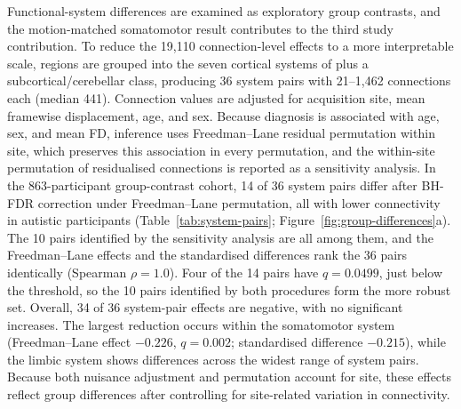 Functional-system differences are examined as exploratory group contrasts, and the motion-matched somatomotor result contributes to the third study contribution. To reduce the 19,110 connection-level effects to a more interpretable scale, regions are grouped into the seven cortical systems of \citet{Yeoetal2011} plus a subcortical/cerebellar class, producing 36 system pairs with 21--1,462 connections each (median 441). Connection values are adjusted for acquisition site, mean framewise displacement, age, and sex. Because diagnosis is associated with age, sex, and mean FD, inference uses Freedman--Lane residual permutation within site, which preserves this association in every permutation, and the within-site permutation of residualised connections is reported as a sensitivity analysis. In the 863-participant group-contrast cohort, 14 of 36 system pairs differ after BH-FDR correction under Freedman--Lane permutation, all with lower connectivity in autistic participants (Table~\ref{tab:system-pairs}; Figure~\ref{fig:group-differences}a). The 10 pairs identified by the sensitivity analysis are all among them, and the Freedman--Lane effects and the standardised differences rank the 36 pairs identically (Spearman $\rho=1.0$). Four of the 14 pairs have $q=0.0499$, just below the threshold, so the 10 pairs identified by both procedures form the more robust set. Overall, 34 of 36 system-pair effects are negative, with no significant increases. The largest reduction occurs within the somatomotor system (Freedman--Lane effect $-0.226$, $q=0.002$; standardised difference $-0.215$), while the limbic system shows differences across the widest range of system pairs. Because both nuisance adjustment and permutation account for site, these effects reflect group differences after controlling for site-related variation in connectivity.

